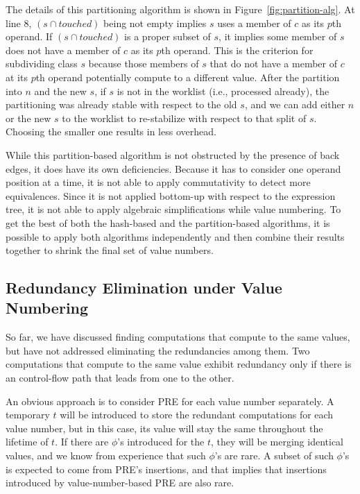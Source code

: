 The details of this partitioning algorithm is shown in Figure~\ref{fig:partition-alg}. 
At line 8, $(s \cap touched)$ being not empty implies $s$ uses a member of $c$ as its $p$th operand. 
If $(s \cap touched)$ is a proper subset of $s$, it implies some member of $s$ does not have a member of $c$ as its $p$th operand. 
This is the criterion for subdividing class $s$ because those members of $s$ that do not have a member of $c$ at its $p$th operand potentially compute to a different value. 
After the partition into $n$ and the new $s$, if $s$ is not in the worklist (i.e., processed already), the partitioning was already stable with respect to the old $s$, and we can add either $n$ or the new $s$ to the worklist to re-stabilize with respect to that split of $s$. 
Choosing the smaller one results in less overhead.

While this partition-based algorithm is not obstructed by the presence of back edges, it does have its own deficiencies. 
Because it has to consider one operand position at a time, it is not able to apply commutativity to detect more equivalences. 
Since it is not applied bottom-up with respect to the expression tree, it is not able to apply algebraic simplifications while value numbering. 
To get the best of both the hash-based and the partition-based algorithms, it is possible to apply both algorithms independently and then combine their results together to shrink the final set of value numbers.

\subsection{Redundancy Elimination under Value Numbering}
So far, we have discussed finding computations that compute to the same values, but have not addressed eliminating the redundancies among them. 
Two computations that compute to the same value exhibit redundancy only if there is an control-flow path that leads from one to the other.

An obvious approach is to consider PRE for each value number separately. 
A temporary $t$ will be introduced to store the redundant computations for each value number, but in this case, its value will stay the same throughout the lifetime of $t$. 
If there are $\phi$'s introduced for the $t$, they will be merging identical values, and we know from experience that such $\phi$'s are rare. 
A subset of such $\phi$'s is expected to come from PRE's insertions, and that implies that insertions introduced by value-number-based PRE are also rare.

